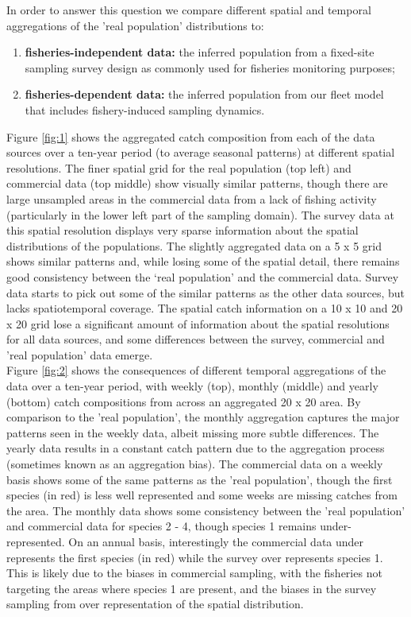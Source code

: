 \documentclass[review]{elsarticle}
\begin{document}
In order to answer this question we compare different spatial and temporal
aggregations of the 'real population' distributions to:
\begin{enumerate}[label=\alph*)]
	\item \textbf{fisheries-independent data:} the inferred population from
		a fixed-site sampling survey design as commonly used for
		fisheries monitoring purposes;
	\item \textbf{fisheries-dependent data:} the inferred population from
		our fleet model that includes fishery-induced sampling
		dynamics.
\end{enumerate}

Figure \ref{fig:1} shows the aggregated catch composition from each of the data
sources over a ten-year period (to average seasonal patterns) at different
spatial resolutions. The finer spatial grid for the real population (top left)
and commercial data (top middle) show visually similar patterns, though there
are large unsampled areas in the commercial data from a lack of fishing
activity (particularly in the lower left part of the sampling domain). The
survey data at this spatial resolution displays very sparse information about
the spatial distributions of the populations. The slightly aggregated data on a
5 x 5 grid shows similar patterns and, while losing some of the spatial detail,
there remains good consistency between the `real population' and the commercial
data. Survey data starts to pick out some of the similar patterns as the other
data sources, but lacks spatiotemporal coverage. The spatial catch information
on a 10 x 10 and 20 x 20 grid lose a significant amount of information about
the spatial resolutions for all data sources, and some differences between the
survey, commercial and 'real population' data emerge. \\

Figure \ref{fig:2} shows the consequences of different temporal aggregations of
the data over a ten-year period, with weekly (top), monthly (middle) and yearly
(bottom) catch compositions from across an aggregated 20 x 20 area. By
comparison to the 'real population', the monthly aggregation captures the major
patterns seen in the weekly data, albeit missing more subtle differences. The
yearly data results in a constant catch pattern due to the aggregation process
(sometimes known as an aggregation bias). The commercial data on a weekly basis
shows some of the same patterns as the 'real population', though the first
species (in red) is less well represented and some weeks are missing catches
from the area. The monthly data shows some consistency between the 'real
population' and commercial data for species 2 - 4, though species 1 remains
under-represented. On an annual basis, interestingly the commercial data under
represents the first species (in red) while the survey over represents species
1. This is likely due to the biases in
commercial sampling, with the fisheries not targeting the areas where species 1
are present, and the biases in the survey sampling from over representation of
the spatial distribution. 
\end{document}
